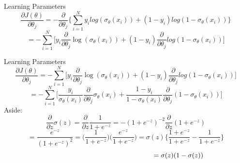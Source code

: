\documentclass{beamer}
\begin{document}
\begin{frame}{Learning Parameters}
\[
\frac{\partial J(\theta)}{\partial \theta_{j}} = -\frac{\partial }{\partial \theta_{j}} \bigg\{\sum_{i=1}^{N} y_{i} log(\sigma_{\theta}(x_{i})) + (1 - y_{i})log(1 - \sigma_{\theta}(x_{i}))\bigg\}
\]
\[
= -\sum_{i=1}^{N}\bigg[y_{i}\frac{\partial}{\partial \theta_{j}} \log(\sigma_{\theta}(x_{i})) + (1-y_{i})\frac{\partial}{\partial \theta_{j}} log(1 - \sigma_{\theta}(x_{i}))\bigg]
\]
\end{frame}
\begin{frame}{Learning Parameters}
\[
\frac{\partial J(\theta)}{\partial \theta_{j}} = -\sum_{i=1}^{N}\bigg[y_{i}\frac{\partial}{\partial \theta_{j}} \log(\sigma_{\theta}(x_{i})) + (1-y_{i})\frac{\partial}{\partial \theta_{j}} log(1 - \sigma_{\theta}(x_{i}))\bigg]
\]
\[
= -\sum_{i=1}^{N}\bigg[\frac{y_{i}}{\sigma_{\theta}(x_{i})} \frac{\partial}{\partial \theta_{j}} \sigma_{\theta}(x_{i}) + \frac{1 - y_{i}}{1 - \sigma_{\theta}(x_{i})} \frac{\partial}{\partial \theta_{j}}(1 - \sigma_{\theta}(x_{i}))\bigg]
\]
Aside:
\begin{equation*}
\frac{\partial}{\partial z}\sigma(z) = \frac{\partial}{\partial z}\frac{1}{1 + e^{-z}} = -(1 + e^{-z})^{-2}\frac{\partial}{\partial z}(1 + e^{-z})
\end{equation*}
\begin{equation*}
= \frac{e^{-z}}{(1 + e^{-z})^{2}} = \bigg(\frac{1}{1 + e^{-z}}\bigg)\bigg(\frac{e^{-z}}{1 + e^{-z}}\bigg) = \sigma(z)\bigg\{\frac{1 + e^{-z}}{1 + e^{-z}} - \frac{1}{1 + e^{-z}}\bigg\}
\end{equation*}
\begin{equation*}
\hspace{5.5cm}= \sigma(z)(1 - \sigma(z))
\end{equation*}
\end{frame}
\end{document}
